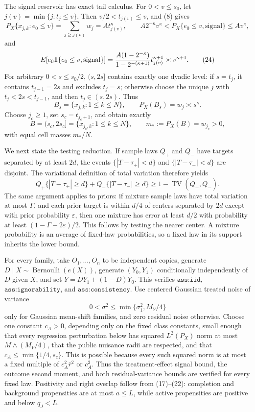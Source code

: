 The signal reservoir has exact tail calculus.  For \(0<v\leq s_0\), let \(j(v)=\min\{j:t_j\leq v\}\).  Then \(v/2<t_{j(v)}\leq v\), and (8) gives
\[
P_X\{x_{j,k}:e_0\leq v\}
=\sum_{j\geq j(v)}w_j=A t_{j(v)}^\kappa,\qquad
A2^{-\kappa}v^\kappa<P_X\{e_0\leq v,\mathrm{signal}\}\leq Av^\kappa, \tag{23}
\]
and
\[
E[e_0\mathbf 1\{e_0\leq v,\mathrm{signal}\}]
={A(1-2^{-\kappa})\over1-2^{-(\kappa+1)}}t_{j(v)}^{\kappa+1}
\asymp v^{\kappa+1}.                                                     \tag{24}
\]
For arbitrary \(0<s\leq s_0/2\), \((s,2s]\) contains exactly one dyadic level: if \(s=t_j\), it contains \(t_{j-1}=2s\) and excludes \(t_j=s\); otherwise choose the unique \(j\) with \(t_j<2s<t_{j-1}\), and then \(t_j\in(s,2s)\).  Thus
\[
B_s=\{x_{j,k}:1\leq k\leq N\},\qquad
P_X(B_s)=w_j\asymp s^\kappa.                                             \tag{25}
\]
Choose \(j_c\geq1\), set \(s_c=t_{j_c+1}\), and obtain exactly
\[
B=(s_c,2s_c]=\{x_{j_c,k}:1\leq k\leq N\},\qquad
m_*:=P_X(B)=w_{j_c}>0,                                                    \tag{26}
\]
with equal cell masses \(m_*/N\).

We next state the testing reduction.  If sample laws \(Q_+\) and \(Q_-\) have targets separated by at least \(2d\), the events \(\{|T-\tau_+|<d\}\) and \(\{|T-\tau_-|<d\}\) are disjoint.  The variational definition of total variation therefore yields
\[
Q_+\{|T-\tau_+|\geq d\}+Q_-\{|T-\tau_-|\geq d\}
\geq1-\operatorname{TV}(Q_+,Q_-).                                       \tag{27}
\]
The same argument applies to priors: if mixture sample laws have total variation at most \(\Gamma\), and each prior target is within \(d/4\) of centers separated by \(2d\) except with prior probability \(\varepsilon\), then one mixture has error at least \(d/2\) with probability at least \((1-\Gamma-2\varepsilon)/2\).  This follows by testing the nearer center.  A mixture probability is an average of fixed-law probabilities, so a fixed law in its support inherits the lower bound.

For every family, take \(O_1,\ldots,O_n\) to be independent copies, generate \(D\mid X\sim\operatorname{Bernoulli}(e(X))\), generate \((Y_0,Y_1)\) conditionally independently of \(D\) given \(X\), and set \(Y=DY_1+(1-D)Y_0\).  This verifies \(\texttt{ass:iid}\), \(\texttt{ass:ignorability}\), and \(\texttt{ass:consistency}\).  Use centered Gaussian treated noise of variance
\[
0<\sigma^2\leq \min\{\sigma_1^2,M_Y/4\}                                \tag{28}
\]
only for Gaussian mean-shift families, and zero residual noise otherwise.  Choose one constant \(c_A>0\), depending only on the fixed class constants, small enough that every regression perturbation below has squared \(L^2(P_X)\) norm at most \(M\wedge(M_Y/4)\), that the public nuisance radii are respected, and that \(c_A\leq\min\{1/4,s_c\}\).  This is possible because every such squared norm is at most a fixed multiple of \(c_A^2\bar r^2\) or \(c_A^2\).  Thus the treatment-effect signal bound, the outcome second moment, and both residual-variance bounds are verified for every fixed law.  Positivity and right overlap follow from (17)--(22): completion and background propensities are at most \(a\leq L\), while active propensities are positive and below \(q_J<L\).

